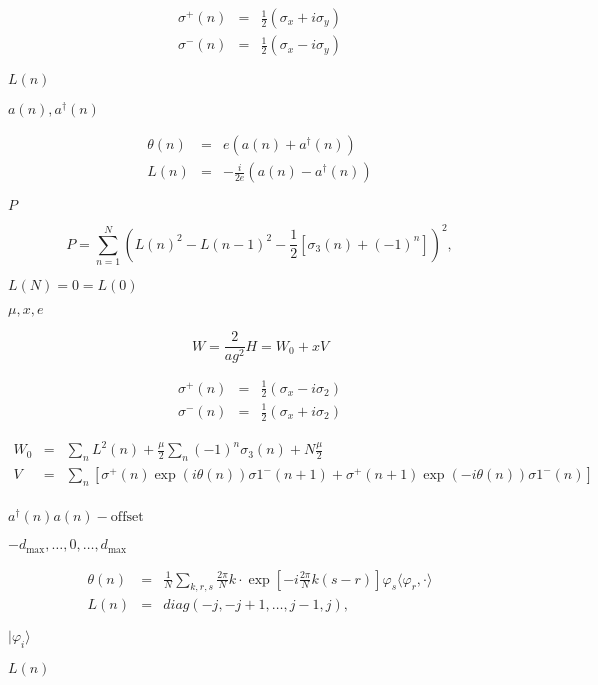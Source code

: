 \documentclass{article}
\begin{document}
{\begin{eqnarray*} \sigma^+(n) &=& \frac{1}{2}(\sigma_x + i\sigma_y) \\ \sigma^-(n) &=& \frac{1}{2}(\sigma_x - i\sigma_y) \end{eqnarray*}
\pagebreak

$ L(n)$
\pagebreak

$ a(n), a^\dagger(n) $
\pagebreak

\begin{eqnarray*} \theta(n) &=& e\left(a(n)+a^\dagger(n)\right)\\ L(n) &=& -\frac{i}{2e}\left(a(n) - a^\dagger(n)\right) \end{eqnarray*}
\pagebreak

$ P $
\pagebreak

\[ P=\sum_{n=1}^N\left(L(n)^2 - L(n-1)^2 -\frac{1}{2}\left[\sigma_3(n)+(-1)^n\right]\right)^2, \]
\pagebreak

$ L(N) = 0 = L(0) $
\pagebreak

$ \mu, x, e $
\pagebreak

\[ W =\frac{2}{ag^2} H = W_0+xV \]
\pagebreak

\begin{eqnarray*} \sigma^+(n) &=& \frac{1}{2}(\sigma_x - i\sigma_2) \\ \sigma^-(n) &=& \frac{1}{2}(\sigma_x + i\sigma_2) \end{eqnarray*}
\pagebreak

\begin{eqnarray*} W_0 &=& \sum_n L^2(n) + \frac{\mu}{2}\sum_n(-1)^n\sigma_3(n)+N\frac{\mu}{2}\\ V &=& \sum_n\left[\sigma^+(n)\exp(i\theta(n))\sigma1^-(n+1) + \sigma^+(n+1)\exp(-i\theta(n))\sigma1^-(n)\right] \\ \end{eqnarray*}
\pagebreak

$ a^\dagger(n)a(n) -\mathrm{offset}$
\pagebreak

$ -d_\mathrm{max},\dots,0,\dots,d_\mathrm{max} $
\pagebreak

\begin{eqnarray*} \theta(n) &=& \frac{1}{N}\sum_{k,r,s}\frac{2\pi}{N}k\cdot\exp\left[-i\frac{2\pi}{N}k(s-r)\right]\varphi_s\langle\varphi_r,\cdot\rangle \\ L(n) &=& diag(-j,-j+1,\dots,j-1,j), \end{eqnarray*}
\pagebreak

$ |\varphi_i\rangle $
\pagebreak

$ L(n) $
\pagebreak

}
\end{document}
